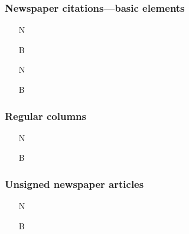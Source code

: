 \documentclass[11pt,letterpaper,oneside]{article}
\begin{document}
\subsubsection{Newspaper citations---basic elements}

\begin{itemize}
\item[N] 

\item[B] 

\item[N] 

\item[B] 
\end{itemize}

\setcounter{subsubsection}{204}
\subsubsection{Regular columns}

\begin{itemize}
\item[N] 

\item[B] 
\end{itemize}

\setcounter{subsubsection}{206}
\subsubsection{Unsigned newspaper articles}

\begin{itemize}
\item[N] 

\item[B] 
\end{itemize}



\setcounter{subsubsection}{214}
\end{document}
